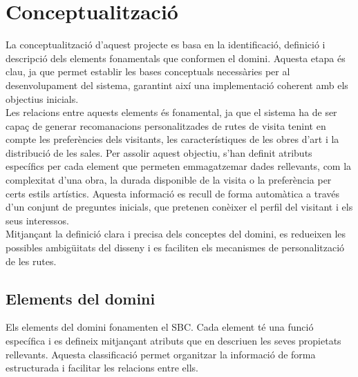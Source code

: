 \documentclass[a4paper]{article}
\begin{document}
	\newpage
	\section{Conceptualització}
	
	La conceptualització d'aquest projecte es basa en la identificació, definició i descripció dels elements fonamentals que conformen el domini. Aquesta etapa és clau, ja que permet establir les bases conceptuals necessàries per al desenvolupament del sistema, garantint així una implementació coherent amb els objectius inicials. \\
	
	Les relacions entre aquests elements és fonamental, ja que el sistema ha de ser capaç de generar recomanacions personalitzades de rutes de visita tenint en compte les preferències dels visitants, les característiques de les obres d'art i la distribució de les sales. Per assolir aquest objectiu, s'han definit atributs específics per cada element que permeten emmagatzemar dades rellevants, com la complexitat d'una obra, la durada disponible de la visita o la preferència per certs estils artístics. Aquesta informació es recull de forma automàtica a través d'un conjunt de preguntes inicials, que pretenen conèixer el perfil del visitant i els seus interessos. \\
	
	Mitjançant la definició clara i precisa dels conceptes del domini, es redueixen les possibles ambigüitats del disseny i es faciliten els mecanismes de personalització de les rutes. \\
		
	\subsection{Elements del domini}
	\label{sec:elements_del_domini}
	
	Els elements del domini fonamenten el SBC. Cada element té una funció específica i es defineix mitjançant atributs que en descriuen les seves propietats rellevants. Aquesta classificació permet organitzar la informació de forma estructurada i facilitar les relacions entre ells. \\
	
\end{document}
